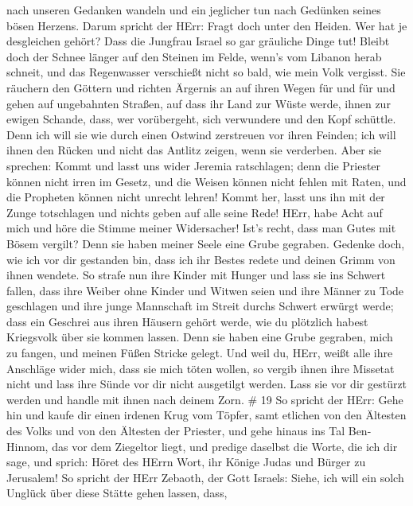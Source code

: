 nach unseren Gedanken wandeln und ein jeglicher tun nach Gedünken seines
bösen Herzens.  Darum spricht der HErr: Fragt doch unter
den Heiden. Wer hat je desgleichen gehört? Dass die Jungfrau Israel so
gar gräuliche Dinge tut!  Bleibt doch der Schnee länger auf
den Steinen im Felde, wenn's vom Libanon herab schneit, und das
Regenwasser verschießt nicht so bald, wie mein Volk vergisst.
 Sie räuchern den Göttern und richten Ärgernis an auf ihren
Wegen für und für und gehen auf ungebahnten Straßen,  auf
dass ihr Land zur Wüste werde, ihnen zur ewigen Schande, dass, wer
vorübergeht, sich verwundere und den Kopf schüttle.  Denn
ich will sie wie durch einen Ostwind zerstreuen vor ihren Feinden; ich
will ihnen den Rücken und nicht das Antlitz zeigen, wenn sie verderben.
 Aber sie sprechen: Kommt und lasst uns wider Jeremia
ratschlagen; denn die Priester können nicht irren im Gesetz, und die
Weisen können nicht fehlen mit Raten, und die Propheten können nicht
unrecht lehren! Kommt her, lasst uns ihn mit der Zunge totschlagen und
nichts geben auf alle seine Rede!  HErr, habe Acht auf mich
und höre die Stimme meiner Widersacher!  Ist's recht, dass
man Gutes mit Bösem vergilt? Denn sie haben meiner Seele eine Grube
gegraben. Gedenke doch, wie ich vor dir gestanden bin, dass ich ihr
Bestes redete und deinen Grimm von ihnen wendete.  So
strafe nun ihre Kinder mit Hunger und lass sie ins Schwert fallen, dass
ihre Weiber ohne Kinder und Witwen seien und ihre Männer zu Tode
geschlagen und ihre junge Mannschaft im Streit durchs Schwert erwürgt
werde;  dass ein Geschrei aus ihren Häusern gehört werde,
wie du plötzlich habest Kriegsvolk über sie kommen lassen. Denn sie
haben eine Grube gegraben, mich zu fangen, und meinen Füßen Stricke
gelegt.  Und weil du, HErr, weißt alle ihre Anschläge wider
mich, dass sie mich töten wollen, so vergib ihnen ihre Missetat nicht
und lass ihre Sünde vor dir nicht ausgetilgt werden. Lass sie vor dir
gestürzt werden und handle mit ihnen nach deinem Zorn. \# 19
 So spricht der HErr: Gehe hin und kaufe dir einen irdenen
Krug vom Töpfer, samt etlichen von den Ältesten des Volks und von den
Ältesten der Priester,  und gehe hinaus ins Tal Ben-Hinnom,
das vor dem Ziegeltor liegt, und predige daselbst die Worte, die ich dir
sage,  und sprich: Höret des HErrn Wort, ihr Könige Judas
und Bürger zu Jerusalem! So spricht der HErr Zebaoth, der Gott Israels:
Siehe, ich will ein solch Unglück über diese Stätte gehen lassen, dass,
